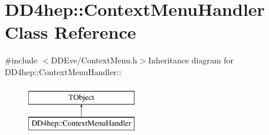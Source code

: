 \hypertarget{class_d_d4hep_1_1_context_menu_handler}{
\section{DD4hep::ContextMenuHandler Class Reference}
\label{class_d_d4hep_1_1_context_menu_handler}
}


{\ttfamily \#include $<$DDEve/ContextMenu.h$>$}Inheritance diagram for DD4hep::ContextMenuHandler::\begin{figure}[H]
\begin{center}
\leavevmode
\includegraphics[height=2cm]{class_d_d4hep_1_1_context_menu_handler}
\end{center}
\end{figure}
